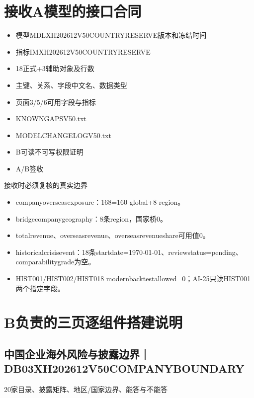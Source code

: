 \documentclass[UTF8,openany,zihao=-4]{ctexbook}
\renewcommand{\_}{\textunderscore\allowbreak}
\begin{document}
\chapter{接收A模型的接口合同}
\begin{itemize}[label=$\square$]
\item 模型MDL\_XH202612\_V50\_COUNTRY\_RESERVE版本和冻结时间
\item 指标IM\_XH202612\_V50\_COUNTRY\_RESERVE
\item 18正式+3辅助对象及行数
\item 主键、关系、字段中文名、数据类型
\item 页面3/5/6可用字段与指标
\item KNOWN\_GAPS\_V50.txt
\item MODEL\_CHANGELOG\_V50.txt
\item B可读不可写权限证明
\item A/B签收
\end{itemize}
\begin{dangerbox}{接收时必须复核的真实边界}
\begin{itemize}
\item company\_overseas\_exposure：168=160 global+8 region。
\item bridge\_company\_geography：8条region，国家桥0。
\item total\_revenue、overseas\_revenue、overseas\_revenue\_share可用值0。
\item historical\_crisis\_event：18条start\_date=1970-01-01、review\_status=pending、comparability\_grade为空。
\item HIST001/HIST002/HIST018 modern\_backtest\_allowed=0；AI-25只读HIST001两个指定字段。
\end{itemize}
\end{dangerbox}
\chapter{B负责的三页逐组件搭建说明}
\section{中国企业海外风险与披露边界｜DB03\_XH202612\_V50\_COMPANY\_BOUNDARY}
20家目录、披露矩阵、地区/国家边界、能答与不能答
\end{document}
